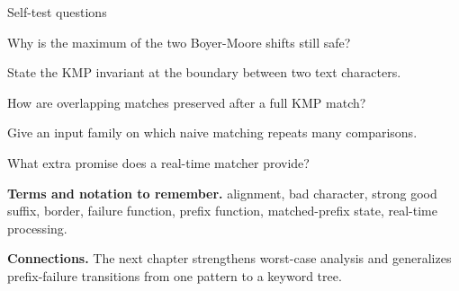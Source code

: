 \documentclass[11pt,letterpaper]{article}
\begin{document}
\begin{CornellExamBox}{Self-test questions}
\begin{CornellRecallList}
  \item Why is the maximum of the two Boyer-Moore shifts still safe?
  \item State the KMP invariant at the boundary between two text characters.
  \item How are overlapping matches preserved after a full KMP match?
  \item Give an input family on which naive matching repeats many comparisons.
  \item What extra promise does a real-time matcher provide?
\end{CornellRecallList}
\end{CornellExamBox}

{\footnotesize
\textbf{Terms and notation to remember.} alignment, bad character, strong good suffix, border, failure function, prefix function, matched-prefix state, real-time processing.

\textbf{Connections.} The next chapter strengthens worst-case analysis and generalizes prefix-failure transitions from one pattern to a keyword tree.
}
\end{document}
